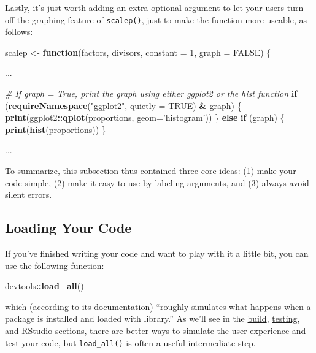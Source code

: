 \documentclass[]{book}
\newenvironment{Shaded}{\begin{snugshade}}{\end{snugshade}}
\newcommand{\KeywordTok}[1]{\textcolor[rgb]{0.13,0.29,0.53}{\textbf{#1}}}
\newcommand{\DataTypeTok}[1]{\textcolor[rgb]{0.13,0.29,0.53}{#1}}
\newcommand{\DecValTok}[1]{\textcolor[rgb]{0.00,0.00,0.81}{#1}}
\newcommand{\StringTok}[1]{\textcolor[rgb]{0.31,0.60,0.02}{#1}}
\newcommand{\CommentTok}[1]{\textcolor[rgb]{0.56,0.35,0.01}{\textit{#1}}}
\newcommand{\OtherTok}[1]{\textcolor[rgb]{0.56,0.35,0.01}{#1}}
\newcommand{\ControlFlowTok}[1]{\textcolor[rgb]{0.13,0.29,0.53}{\textbf{#1}}}
\newcommand{\OperatorTok}[1]{\textcolor[rgb]{0.81,0.36,0.00}{\textbf{#1}}}
\newcommand{\NormalTok}[1]{#1}
\begin{document}
Lastly, it's just worth adding an extra optional argument to let your
users turn off the graphing feature of \texttt{scalep()}, just to make
the function more useable, as follows:

\begin{Shaded}
\begin{Highlighting}[]
\NormalTok{scalep <-}\StringTok{ }\ControlFlowTok{function}\NormalTok{(factors, divisors, }\DataTypeTok{constant =} \DecValTok{1}\NormalTok{, }\DataTypeTok{graph =} \OtherTok{FALSE}\NormalTok{) \{}

\NormalTok{  ...}

  \CommentTok{# If graph = True, print the graph using either ggplot2 or the hist function}
  \ControlFlowTok{if}\NormalTok{ (}\KeywordTok{requireNamespace}\NormalTok{(}\StringTok{"ggplot2"}\NormalTok{, }\DataTypeTok{quietly =} \OtherTok{TRUE}\NormalTok{) }\OperatorTok{&}\StringTok{ }\NormalTok{graph) \{}
    \KeywordTok{print}\NormalTok{(ggplot2}\OperatorTok{::}\KeywordTok{qplot}\NormalTok{(proportions, }\DataTypeTok{geom=}\StringTok{'histogram'}\NormalTok{))}
\NormalTok{  \} }\ControlFlowTok{else} \ControlFlowTok{if}\NormalTok{ (graph) \{}
    \KeywordTok{print}\NormalTok{(}\KeywordTok{hist}\NormalTok{(proportions))}
\NormalTok{  \}}

\NormalTok{  ...}
\end{Highlighting}
\end{Shaded}

To summarize, this subsection thus contained three core ideas: (1) make
your code simple, (2) make it easy to use by labeling arguments, and (3)
always avoid silent errors.

\subsection{Loading Your Code}\label{loading-your-code}

If you've finished writing your code and want to play with it a little
bit, you can use the following function:

\begin{Shaded}
\begin{Highlighting}[]
\NormalTok{devtools}\OperatorTok{::}\KeywordTok{load_all}\NormalTok{()}
\end{Highlighting}
\end{Shaded}

which (according to its documentation) ``roughly simulates what happens
when a package is installed and loaded with library.'' As we'll see in
the \protect\hyperlink{releasing-your-package}{build},
\protect\hyperlink{testing}{testing}, and
\href{./integrated-development-environments.html\#ex-building-packages}{RStudio}
sections, there are better ways to simulate the user experience and test
your code, but \texttt{load\_all()} is often a useful intermediate step.
\end{document}
